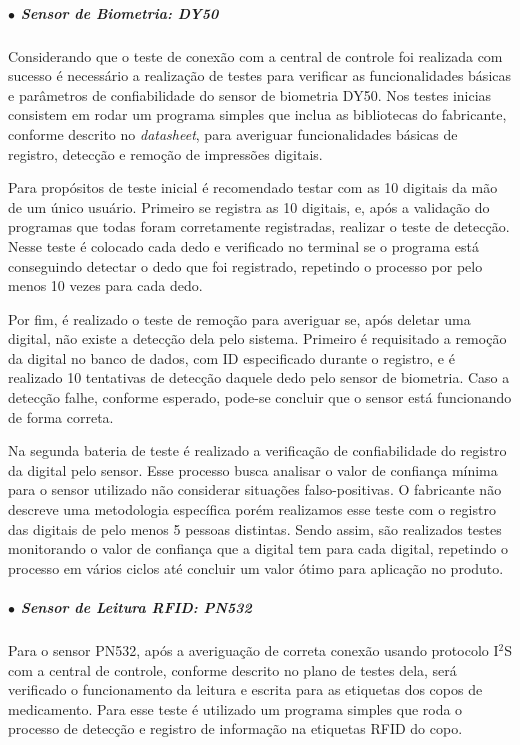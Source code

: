\subparagraph*{$\bullet$ Sensor de Biometria: DY50} \hfill

Considerando que o teste de conexão com a central de controle foi realizada com sucesso é necessário a realização de testes para verificar as funcionalidades básicas e parâmetros de confiabilidade do sensor de biometria DY50. Nos testes inicias consistem em rodar um programa simples que inclua as bibliotecas do fabricante, conforme descrito no \textit{datasheet}, para averiguar funcionalidades básicas de registro, detecção e remoção de impressões digitais. 

Para propósitos de teste inicial é recomendado testar com as 10 digitais da mão de um único usuário. Primeiro se registra as 10 digitais, e, após a validação do programas que todas foram corretamente registradas, realizar o teste de detecção. Nesse teste é colocado cada dedo e verificado no terminal se o programa está conseguindo detectar o dedo que foi registrado, repetindo o processo por pelo menos 10 vezes para cada dedo. 

Por fim, é realizado o teste de remoção para averiguar se, após deletar uma digital, não existe a detecção dela pelo sistema. Primeiro é requisitado a remoção da digital no banco de dados, com ID especificado durante o registro, e é realizado 10 tentativas de detecção daquele dedo pelo sensor de biometria. Caso a detecção falhe, conforme esperado, pode-se concluir que o sensor está funcionando de forma correta.

Na segunda bateria de teste é realizado a verificação de confiabilidade do registro da digital pelo sensor. Esse processo busca analisar o valor de confiança mínima para o sensor utilizado não considerar situações falso-positivas. O fabricante não descreve uma metodologia específica porém realizamos esse teste com o registro das digitais de pelo menos 5 pessoas distintas. Sendo assim, são realizados testes monitorando o valor de confiança que a digital tem para cada digital, repetindo o processo em vários ciclos até concluir um valor ótimo para aplicação no produto.

\subparagraph*{$\bullet$ Sensor de Leitura RFID: PN532} \hfill

Para o sensor PN532, após a averiguação de correta conexão usando protocolo I$^2$S com a central de controle, conforme descrito no plano de testes dela, será verificado o funcionamento da leitura e escrita para as etiquetas dos copos de medicamento. Para esse teste é utilizado um programa simples que roda o processo de detecção e registro de informação na etiquetas RFID do copo. 

